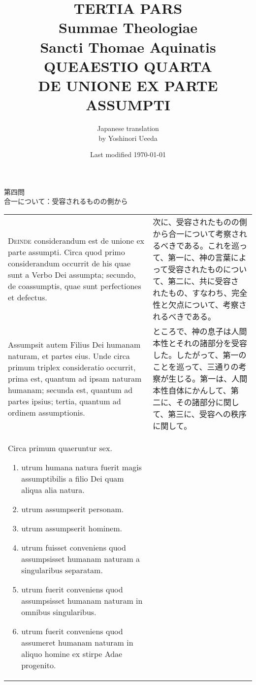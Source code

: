 \documentclass[10pt]{jsarticle} %
\title{{\bf TERTIA PARS}\\{\HUGE Summae Theologiae}\\Sancti Thomae
Aquinatis\\{\sffamily QUEAESTIO QUARTA}\\DE UNIONE EX PARTE ASSUMPTI}
\author{Japanese translation\\by Yoshinori {\sc Ueeda}}
\date{Last modified \today}
\begin{document}
\maketitle
\pagestyle{fancy}


\begin{center}
{\Large 第四問\\合一について：受容されるものの側から}
\end{center}


\begin{longtable}{p{21em}p{21em}}




{\Huge D}{\scshape einde} considerandum est de unione ex parte
 assumpti. Circa quod primo considerandum occurrit de his quae sunt a
 Verbo Dei assumpta; secundo, de coassumptis, quae sunt perfectiones et
 defectus. 

&

次に、受容されたものの側から合一について考察されるべきである。これを巡っ
 て、第一に、神の言葉によって受容されたものについて、第二に、共に受容さ
 れたもの、すなわち、完全性と欠点について、考察されるべきである。

\\



Assumpsit autem Filius Dei humanam naturam, et partes eius. Unde circa
 primum triplex consideratio occurrit, prima est, quantum ad ipsam
 naturam humanam; secunda est, quantum ad partes ipsius; tertia, quantum
 ad ordinem assumptionis. 



&

ところで、神の息子は人間本性とそれの諸部分を受容した。したがって、第一の
 ことを巡って、三通りの考察が生じる。第一は、人間本性自体にかんして、第
 二に、その諸部分に関して、第三に、受容への秩序に関して。


\\



Circa primum quaeruntur sex. 

\begin{enumerate}
 \item utrum humana natura fuerit magis assumptibilis a filio Dei quam
       aliqua alia natura.
 \item utrum assumpserit personam.
 \item utrum assumpserit hominem.
 \item utrum fuisset conveniens quod assumpsisset humanam naturam a
       singularibus separatam.
 \item utrum fuerit conveniens quod assumpsisset humanam naturam in
       omnibus singularibus.
 \item utrum fuerit conveniens quod assumeret humanam naturam in aliquo homine ex stirpe Adae progenito.
\end{enumerate}



\end{longtable}
\end{document}
